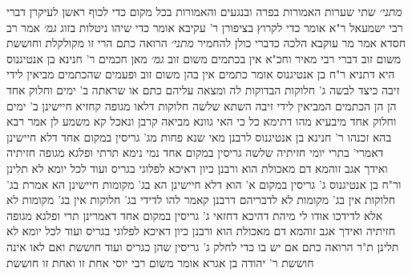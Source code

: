 \documentclass[12pt, openany]{book}
\begin{document}
{{\large\emph{מתני׳}} שתי שערות האמורות בפרה ובנגעים והאמורות בכל מקום כדי לכוף ראשן לעיקרן דברי רבי ישמעאל ר"א אומר כדי לקרוץ בציפורן ר' עקיבא אומר כדי שיהו ניטלות בזוג
{\large\emph{גמ׳}} אמר רב חסדא אמר מר עוקבא הלכה כדברי כולן להחמיר
{\large\emph{מתני׳}} הרואה כתם הרי זו מקולקלת 
וחוששת משום זוב דברי רבי מאיר וחכ"א אין בכתמים משום זוב
{\large\emph{גמ׳}} מאן חכמים ר' חנינא בן אנטיגנוס היא דתניא ר"ח בן אנטיגנוס אומר כתמים אין בהן משום זוב ופעמים שהכתמים מביאין לידי זיבה 
כיצד לבשה ג' חלוקות הבדוקות לה ומצאה עליהם כתם או שראתה ב' ימים וחלוק אחד הן הן הכתמים המביאין לידי זיבה 
השתא שלשה חלוקות דלאו מגופה קחזיא חיישינן ב' ימים וחלוק אחד מיבעיא 
מהו דתימא כל כי האי גוונא מביאה קרבן ונאכל קא משמע לן 
אמר רבא בהא זכנהו ר' חנינא בן אנטיגנוס לרבנן מאי שנא פחות מג' גריסין במקום אחד דלא חיישינן דאמרי' בתרי יומי חזיתיה שלשה גריסין במקום אחד נמי נימא תרתי ופלגא מגופה חזיתיה ואידך אגב זוהמא דם מאכולת הוא 
ורבנן כיון דאיכא לפלוגי בגריס ועוד לכל יומא לא תלינן 
ור"ח בן אנטיגנוס ג' גריסין במקום א' הוא דלא חיישינן הא בג' מקומות חיישינן הא אמרת בג' חלוקות אין בג' מקומות לא 
לדבריהם דרבנן קאמר להו לדידי בג' חלוקות אין בג' מקומות לא אלא לדידכו אודו לי מיהת דהיכא דחזאי ג' גריסין במקום אחד דאמרינן תרי ופלגא מגופה חזיתיה ואידך אגב זוהמא דם מאכולת הוא 
ורבנן כיון דאיכא לפלוגי בגריס ועוד לכל יומא לא תלינן 
ת"ר הרואה כתם אם יש בו כדי לחלק ג' גריסין שהן כגריס ועוד חוששת ואם לאו אינה חוששת 
ר' יהודה בן אגרא אומר משום רבי יוסי אחת זו ואחת זו חוששת}
\end{document}
